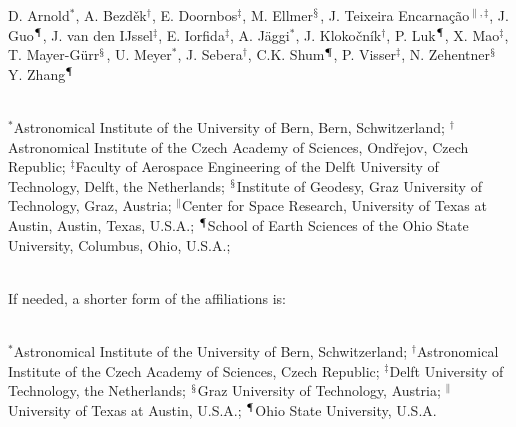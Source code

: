 \documentclass[11pt,a4paper,oneside]{article}
\begin{document}
D. Arnold$^*$, %
A. Bezd\v{e}k$^\dagger$, %
E. Doornbos$^\ddagger$, %
M. Ellmer$^\mathsection$, %
J. Teixeira Encarna\c c\~ao$^{\parallel,\ddagger}$, %
J. Guo$^\mathparagraph$, %
J. van den IJssel$^\ddagger$, %
E. Iorfida$^\ddagger$, %
A. J\"{a}ggi$^*$, %
J. Kloko\v{c}n\'{i}k$^\dagger$, %
P. Luk$^\mathparagraph$, %
X. Mao$^\ddagger$, %
T. Mayer-G\"{u}rr$^\mathsection$, %
U. Meyer$^*$, %
J. Sebera$^\dagger$, %
C.K. Shum$^\mathparagraph$, %
P. Visser$^\ddagger$, %
N. Zehentner$^\mathsection$ %
Y. Zhang$^\mathparagraph$

~\\

$^*$Astronomical Institute of the University of Bern, Bern, Schwitzerland;
$^\dagger$Astronomical Institute of the Czech Academy of Sciences, Ond\v{r}ejov, Czech Republic;
$^\ddagger$Faculty of Aerospace Engineering of the Delft University of Technology, Delft, the Netherlands;
$^\mathsection$Institute of Geodesy, Graz University of Technology, Graz, Austria;
$^\parallel$Center for Space Research, University of Texas at Austin, Austin, Texas, U.S.A.;
$^\mathparagraph$School of Earth Sciences of the Ohio State University, Columbus, Ohio, U.S.A.;

~\\

If needed, a shorter form of the affiliations is:

~\\

$^*$Astronomical Institute of the University of Bern, Schwitzerland;
$^\dagger$Astronomical Institute of the Czech Academy of Sciences, Czech Republic;
$^\ddagger$Delft University of Technology, the Netherlands;
$^\mathsection$Graz University of Technology, Austria;
$^\parallel$University of Texas at Austin, U.S.A.;
$^\mathparagraph$Ohio State University, U.S.A.
\end{document}
